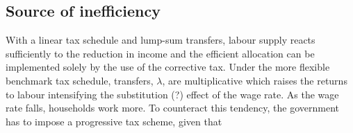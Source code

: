 \subsection{Source of inefficiency}
With a linear tax schedule and lump-sum transfers, labour supply reacts sufficiently to the reduction in income and the efficient allocation can be implemented solely by the use of the corrective tax. Under the more flexible benchmark tax schedule, transfers, $\lambda$, are multiplicative which raises the returns to labour intensifying the substitution (?) effect of the wage rate. As the wage rate falls, households work more. To counteract this tendency, the government has to impose a progressive tax scheme, given that 